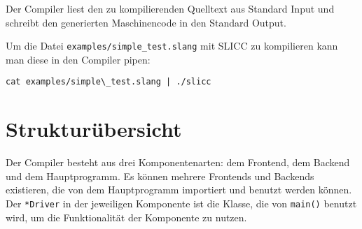 Der Compiler liest den zu kompilierenden Quelltext aus Standard Input und schreibt den generierten Maschinencode in den Standard Output.

Um die Datei \texttt{examples/simple\_test.slang} mit SLICC zu kompilieren kann man diese in den Compiler pipen:

\begin{lstlisting}
cat examples/simple\_test.slang | ./slicc
\end{lstlisting}

\section{Strukturübersicht}


Der Compiler besteht aus drei Komponentenarten: dem Frontend, dem Backend und dem Hauptprogramm.
Es können mehrere Frontends und Backends existieren, die von dem Hauptprogramm importiert und benutzt werden können.\\
Der \texttt{*Driver} in der jeweiligen Komponente ist die Klasse, die von \texttt{main()} benutzt wird, um die Funktionalität der Komponente zu nutzen.\\

